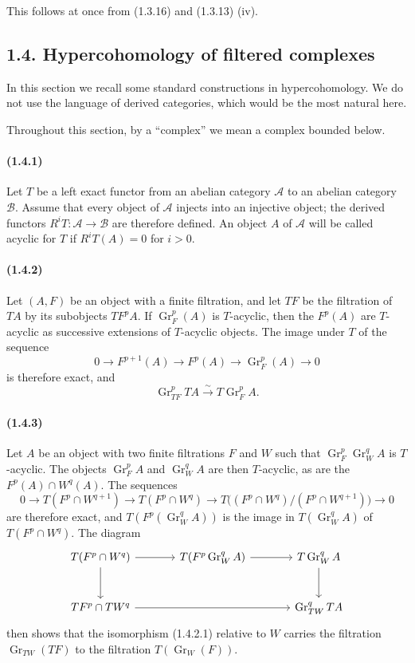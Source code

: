 \documentclass[10pt]{article}
\newcommand{\Gr}{\operatorname{Gr}}
\newcommand{\calA}{\mathcal A}
\newcommand{\calB}{\mathcal B}
\newcommand{\iso}{\xrightarrow{\sim}}
\begin{document}
This follows at once from (1.3.16) and (1.3.13) (iv).

\subsection*{1.4. Hypercohomology of filtered complexes}

In this section we recall some standard constructions in hypercohomology. We do not use the language of derived categories, which would be the most natural here.

Throughout this section, by a ``complex'' we mean a complex bounded below.

\paragraph{(1.4.1)} Let $T$ be a left exact functor from an abelian category $\calA$ to an abelian category $\calB$. Assume that every object of $\calA$ injects into an injective object; the derived functors $R^iT:\calA\to\calB$ are therefore defined. An object $A$ of $\calA$ will be called acyclic for $T$ if $R^iT(A)=0$ for $i>0$.

\paragraph{(1.4.2)} Let $(A,F)$ be an object with a finite filtration, and let $TF$ be the filtration of $TA$ by its subobjects $TF^pA$. If $\Gr_F^p(A)$ is $T$-acyclic, then the $F^p(A)$ are $T$-acyclic as successive extensions of $T$-acyclic objects. The image under $T$ of the sequence
\[
0\to F^{p+1}(A)\to F^p(A)\to\Gr_F^p(A)\to0
\]
is therefore exact, and
\[
\tag{1.4.2.1}
\Gr_{TF}^pTA\iso T\Gr_F^pA.
\]

\paragraph{(1.4.3)} Let $A$ be an object with two finite filtrations $F$ and $W$ such that $\Gr_F^p\Gr_W^qA$ is $T$-acyclic. The objects $\Gr_F^pA$ and $\Gr_W^qA$ are then $T$-acyclic, as are the $F^p(A)\cap W^q(A)$. The sequences
\[
0\to T(F^p\cap W^{q+1})\to T(F^p\cap W^q)\to T\bigl((F^p\cap W^q)/(F^p\cap W^{q+1})\bigr)\to0
\]
are therefore exact, and $T(F^p(\Gr_W^qA))$ is the image in $T(\Gr_W^qA)$ of $T(F^p\cap W^q)$. The diagram
\[
\begin{tikzcd}[column sep=large,row sep=large]
T(F^p\cap W^q) \arrow[r] \arrow[d] & T(F^p\Gr_W^qA) \arrow[r] & T\Gr_W^qA \arrow[d]\\
TF^p\cap TW^q \arrow[rr] && \Gr_{TW}^qTA
\end{tikzcd}
\]
then shows that the isomorphism (1.4.2.1) relative to $W$ carries the filtration $\Gr_{TW}(TF)$ to the filtration $T(\Gr_W(F))$.
\end{document}
